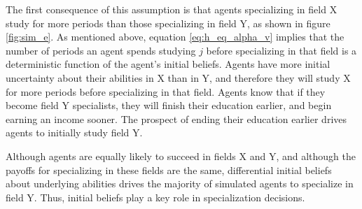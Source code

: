 The first consequence of this assumption is that agents specializing in field X study for more periods than those specializing in field Y, as shown in figure \ref{fig:sim_e}.
As mentioned above, equation \eqref{eq:h_eq_alpha_v} implies that the number of periods an agent spends studying $j$ before specializing in that field is a deterministic function of the agent's initial beliefs.
Agents have more initial uncertainty about their abilities in X than in Y, and therefore they will study X for more periods before specializing in that field.
Agents know that if they become field Y specialists, they will finish their education earlier, and begin earning an income sooner.
The prospect of ending their education earlier drives agents to initially study field Y.

Although agents are equally likely to succeed in fields X and Y, and although the payoffs for specializing in these fields are the same, differential initial beliefs about underlying abilities drives the majority of simulated agents to specialize in field Y.
Thus, initial beliefs play a key role in specialization decisions. 



